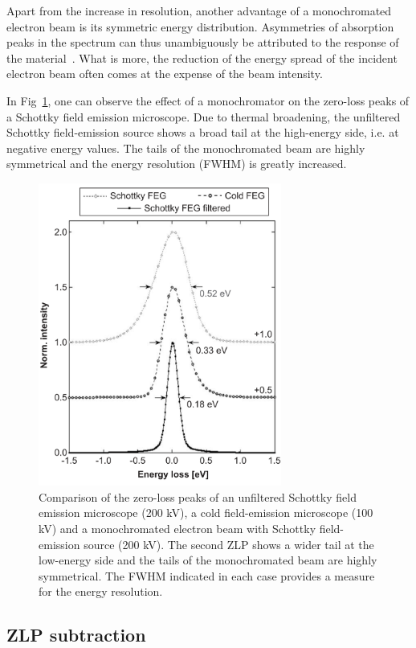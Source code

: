 Apart from the increase in resolution, another advantage of a monochromated 
electron beam is its symmetric energy distribution. 
%
Asymmetries of absorption peaks in the spectrum can thus 
unambiguously be attributed to the response of the material~\cite{erni}.
%
What is more, the reduction of the energy spread of the incident electron beam often 
comes at the expense of the beam intensity. 
%

In Fig~\ref{fig:monochromation}, one can observe the effect of a monochromator 
on the zero-loss peaks of a Schottky field emission microscope. 
%
Due to thermal broadening, the unfiltered Schottky field-emission source
shows a broad tail at the high-energy side, i.e. at negative energy values.
%
The tails of the monochromated beam are highly symmetrical and the energy resolution (FWHM)
is greatly increased.

\begin{figure}[h]
    \centering
    \includegraphics[width=80mm]{plots/monochromator.png}
    \caption{Comparison of the zero-loss peaks of an unfiltered Schottky field emission microscope 
    (200 kV), a cold field-emission microscope (100 kV) and a monochromated electron beam with 
    Schottky field-emission source (200 kV). 
    The second ZLP shows a wider tail at the low-energy side and the tails of the 
    monochromated beam are highly symmetrical. 
    The FWHM indicated in each case provides a measure for the energy resolution.}
    \label{fig:monochromation}
\end{figure}


\subsection{ZLP subtraction}

